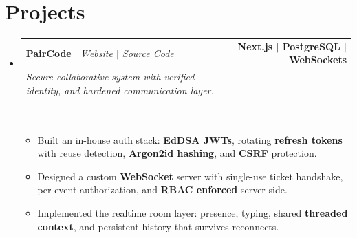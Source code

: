 \documentclass[letterpaper,11pt]{article}
\makeatletter
\newcommand{\resumeItem}[1]{
  \item\small{
    {#1 \vspace{0pt}}
  }
}
\newcommand{\resumeProjectHeading}[3]{
    \item
    \begin{tabular*}{1.001\textwidth}[t]{l@{\extracolsep{\fill}}r}
      \small#1 & \textbf{\small #2} \\
      \textit{\small #3}
    \end{tabular*}\vspace{-7pt}
}
\newcommand{\resumeSubHeadingListStart}{\begin{itemize}[leftmargin=0.0in, label={}]}
\newcommand{\resumeSubHeadingListEnd}{\end{itemize}}\vspace{0pt}
\newcommand{\resumeItemListStart}{\begin{itemize}}
\newcommand{\resumeItemListEnd}{\end{itemize}\vspace{-5pt}}
\makeatother
\begin{document}
\section{Projects}
    \vspace{-2pt}
    \resumeSubHeadingListStart
 \resumeProjectHeading
            {\textbf{{PairCode}} $|$ \emph{\href{https://paircode-lime.vercel.app/}{Website}{ $|$ }\href{https://github.com/davidldv/paircode}{Source Code}}}{Next.js $|$ PostgreSQL $|$ WebSockets}{Secure collaborative system with verified identity, and hardened communication layer.}
            \\[5mm]
          \resumeItemListStart
            \resumeItem{Built an in-house auth stack: \textbf{EdDSA JWTs}, rotating \textbf{refresh tokens} with reuse detection, \textbf{Argon2id hashing}, and \textbf{CSRF} protection.}
            \resumeItem{Designed a custom \textbf{WebSocket} server with single-use ticket handshake, per-event authorization, and \textbf{RBAC enforced} server-side.}
            \resumeItem{Implemented the realtime room layer: presence, typing, shared \textbf{threaded context}, and persistent history that survives reconnects.}
          \resumeItemListEnd
 \vspace{-4pt}
\resumeSubHeadingListEnd
\vspace{-14pt}

\end{document}

